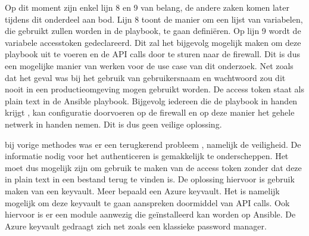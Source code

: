 Op dit moment zijn enkel lijn 8 en 9 van belang, de andere zaken komen later tijdens dit onderdeel aan bod. Lijn 8 toont de manier om een lijst van variabelen, die gebruikt zullen worden in de playbook, te gaan definiëren. Op lijn 9 wordt de variabele access\textunderscore token gedeclareerd. Dit zal het bijgevolg mogelijk maken om deze playbook uit te voeren en de API calls door te sturen naar de firewall. Dit is dus een mogelijke manier van werken voor de use case van dit onderzoek. Net zoals dat het geval was bij het gebruik van gebruikersnaam en wachtwoord zou dit nooit in een productieomgeving mogen gebruikt worden. De access token staat als plain text in de Ansible playbook. Bijgevolg iedereen die de playbook in handen krijgt , kan configuratie doorvoeren op de firewall en op deze manier het gehele netwerk in handen nemen. Dit is dus geen veilige oplossing.
\newpage

bij vorige methodes was er een terugkerend probleem , namelijk de veiligheid. De informatie nodig voor het authenticeren is gemakkelijk te onderscheppen. Het moet dus mogelijk zijn om gebruik te maken van de access token zonder dat deze in plain text in een bestand terug te vinden is. De oplossing hiervoor is gebruik maken van een keyvault. Meer bepaald een Azure keyvault. Het is namelijk mogelijk om deze keyvault te gaan aanspreken doormiddel van API calls. Ook hiervoor is er een module aanwezig die geïnstalleerd kan worden op Ansible. De Azure keyvault gedraagt zich net zoals een klassieke password manager. 

